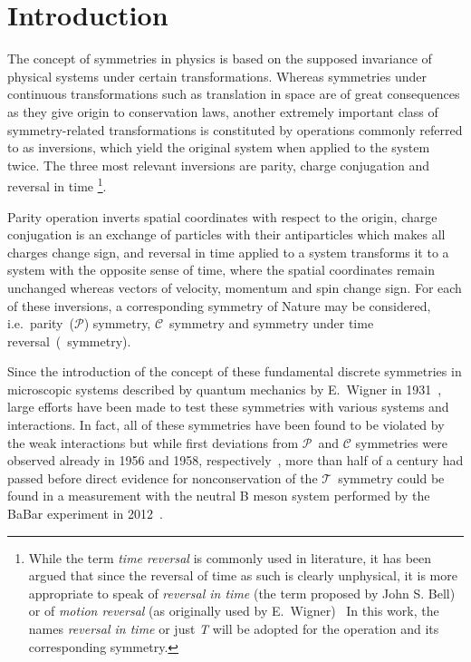 \chapter*{Introduction}

The concept of symmetries in physics is based on the supposed invariance of physical systems under certain transformations. Whereas symmetries under continuous transformations such as translation in space are of great consequences as they give origin to conservation laws, another extremely important class of symmetry-related transformations is constituted by operations commonly referred to as inversions, which yield the original system when applied to the system twice. The three most relevant inversions are parity, charge conjugation and reversal in time%
\footnote{%
  While the term \textit{time reversal} is commonly used in literature, it has been argued that since the reversal of time as such is clearly unphysical, it is more appropriate to speak of \textit{reversal in time} (the term proposed by John S. Bell) or of \textit{motion reversal} (as originally used by E.~Wigner)~\cite{bernabeu_colloquium, sozzi} In this work, the names \textit{reversal in time} or just \textit{T} will be adopted for the operation and its corresponding symmetry.
}.

Parity operation inverts spatial coordinates with respect to the origin, charge conjugation is an exchange of particles with their antiparticles which makes all charges change sign, and reversal in time applied to a system transforms it to a system with the opposite sense of time, where the spatial coordinates remain unchanged whereas vectors of velocity, momentum and spin change sign. For each of these inversions, a corresponding symmetry of Nature may be considered, i.e.\ parity~($\mathcal{P}$) symmetry, $\mathcal{C}$~symmetry and symmetry under time reversal~(\Ts~symmetry).

Since the introduction of the concept of these fundamental discrete symmetries in microscopic systems described by quantum mechanics by E.~Wigner in 1931~\cite{wigner1931}, large efforts have been made to test these symmetries with various systems and interactions. In fact, all of these symmetries have been found to be violated by the weak interactions but while first deviations from $\mathcal{P}$~and $\mathcal{C}$ symmetries were observed already in 1956 and 1958, respectively~\cite{parity_violation, c_violation}, more than half of a century had passed before direct evidence for nonconservation of the $\mathcal{T}$~symmetry could be found in a measurement with the neutral B meson system performed by the BaBar experiment in 2012~\cite{t_violation_babar}.

